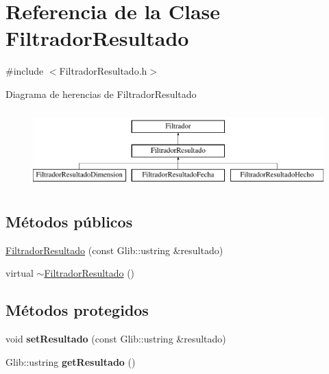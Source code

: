 \hypertarget{classFiltradorResultado}{\section{\-Referencia de la \-Clase \-Filtrador\-Resultado}
\label{classFiltradorResultado}
}


{\ttfamily \#include $<$\-Filtrador\-Resultado.\-h$>$}

\-Diagrama de herencias de \-Filtrador\-Resultado\begin{figure}[H]
\begin{center}
\leavevmode
\includegraphics[height=3.000000cm]{classFiltradorResultado}
\end{center}
\end{figure}
\subsection*{\-Métodos públicos}
\begin{DoxyCompactItemize}
\item 
\hyperlink{classFiltradorResultado_a305a76ab5ae0d11fad7977ac5721943f}{\-Filtrador\-Resultado} (const \-Glib\-::ustring \&resultado)
\item 
virtual \hyperlink{classFiltradorResultado_a4a290c0913c74902a0a784cd6d4a4576}{$\sim$\-Filtrador\-Resultado} ()
\end{DoxyCompactItemize}
\subsection*{\-Métodos protegidos}
\begin{DoxyCompactItemize}
\item 
\hypertarget{classFiltradorResultado_a849d09be2b85fc4d0e2ef1ea71b52b0a}{void {\bfseries set\-Resultado} (const \-Glib\-::ustring \&resultado)}\label{classFiltradorResultado_a849d09be2b85fc4d0e2ef1ea71b52b0a}

\item 
\hypertarget{classFiltradorResultado_a4dacaca662d9f373a7bceaec7dd97f9c}{\-Glib\-::ustring {\bfseries get\-Resultado} ()}\label{classFiltradorResultado_a4dacaca662d9f373a7bceaec7dd97f9c}

\end{DoxyCompactItemize}


